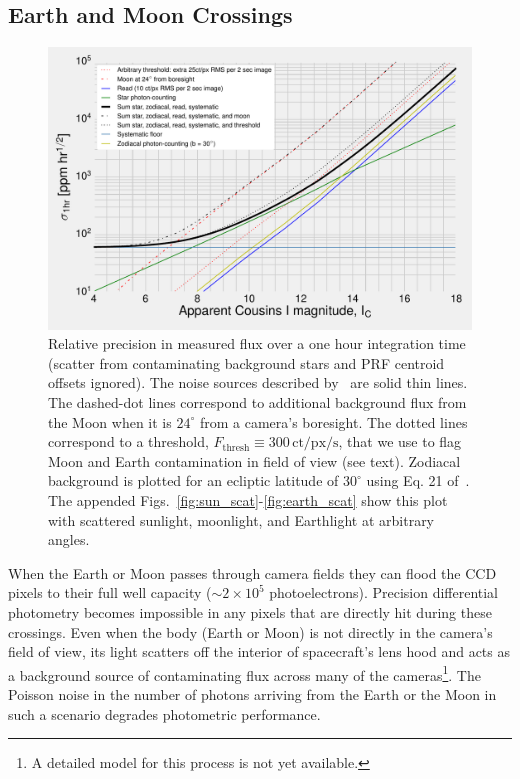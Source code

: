 \subsection{Earth and Moon Crossings}
\label{sec:earth_moon_crossings}
\begin{figure}[!tb]
	\centering
	\includegraphics{figures/precision_memo.pdf}
	\caption{Relative precision in measured flux over a one hour integration 
	time (scatter from contaminating background stars and PRF centroid offsets 
	ignored). The noise sources described by~\protect\citet{Sullivan_2015} are 
	solid thin lines.
	The dashed-dot lines correspond to additional background flux from the Moon 
	when it is $24^\circ$ from a camera's boresight.	
	The dotted lines correspond to a threshold, $F_\mathrm{thresh}\equiv 
	300\,\mathrm{ct/px/s}$, that we use to flag Moon and Earth contamination in 
	\tesss field of view (see text).
	Zodiacal background is plotted for an ecliptic latitude of $30^\circ$ using 
	Eq. 21 of~\protect\citet{Sullivan_2015}.
	The appended Figs.~\protect\ref{fig:sun_scat}-\protect\ref{fig:earth_scat} 
	show this plot with scattered sunlight, moonlight, and Earthlight at 
	arbitrary angles.
	}
	\label{fig:noise_with_moon}
\end{figure}

When the Earth or Moon passes through \tesss camera fields they can
flood the CCD pixels to their full well capacity ($\sim2\times10^5$
photoelectrons).  Precision differential photometry becomes impossible
in any pixels that are directly hit during these crossings.  Even when
the body (Earth or Moon) is not directly in the camera's field of
view, its light scatters off the interior of spacecraft's lens hood
and acts as a background source of contaminating flux across many of
the cameras\footnote{A detailed model for this process is not yet
  available.}.  
The Poisson noise in the number of photons
arriving from the Earth or the Moon in such a scenario degrades \tesss
photometric performance.   

